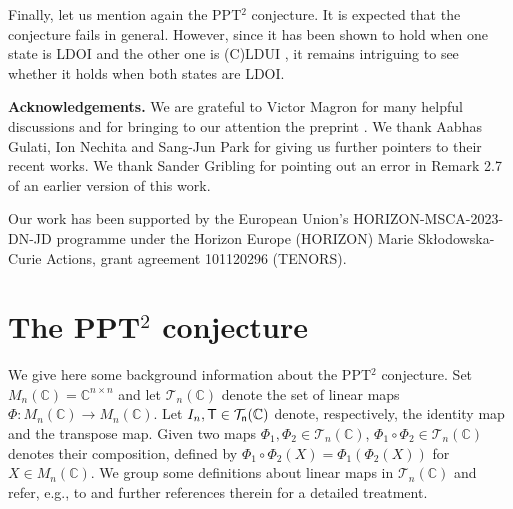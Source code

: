 \documentclass[11pt]{article}
\newcommand{\C}{\ensuremath{\mathbb{C}}} %
\newcommand{\MT}{{\mathcal T}}
\theoremstyle{plain}
\newcommand{\ML}{\textcolor{blue}}
\begin{document}
\medskip
Finally, let us mention again  the PPT$^2$ conjecture. 
It is   expected that   the conjecture   fails in general. However, {since it has been shown to hold when one state is LDOI and the other one is (C)LDUI \cite{Singh-Nechita-PPT2,Nechita-Park_2025},} it remains intriguing to see whether it holds when both states are  LDOI.

%

\bigskip\noindent
{\bf Acknowledgements.} 
We are grateful to Victor Magron for many helpful discussions and for bringing to our attention the preprint \cite{GNP_2025}.  We thank Aabhas Gulati, Ion Nechita and Sang-Jun Park for giving us further pointers to their recent works. We thank Sander Gribling for pointing out an error in Remark 2.7 of an earlier version of this work.

Our work has been supported by the European Union's
HORIZON-MSCA-2023-DN-JD programme under the Horizon Europe (HORIZON) Marie
Sk\l odowska-Curie Actions, grant agreement 101120296 (TENORS).





\appendix


\section{The PPT$^2$ conjecture}\label{A:PPT^2Conj}


We give here some background information about the PPT$^2$ conjecture.
Set $M_n(\C)=\C^{n\times n}$ and let $\MT_n(\C)$ denote the set of linear maps $\Phi: M_n(\C)\to M_n(\C)$. %
Let $I_n, \sf T\in \MT_n(\C)$ denote, respectively,  the identity map and the transpose map. Given two maps $\Phi_1,\Phi_2\in\MT_n(\C)$, $\Phi_1\circ \Phi_2\in\MT_n(\C)$ denotes their  composition, defined by $\Phi_1\circ\Phi_2(X)=\Phi_1(\Phi_2(X))$ for $X\in M_n(\C)$. 
We group some definitions about linear maps in $\MT_n(\C)$ and refer, e.g., to \cite{SN-CLDUI,Singh-Nechita-PPT2} and further references therein for a detailed treatment.
\end{document}
